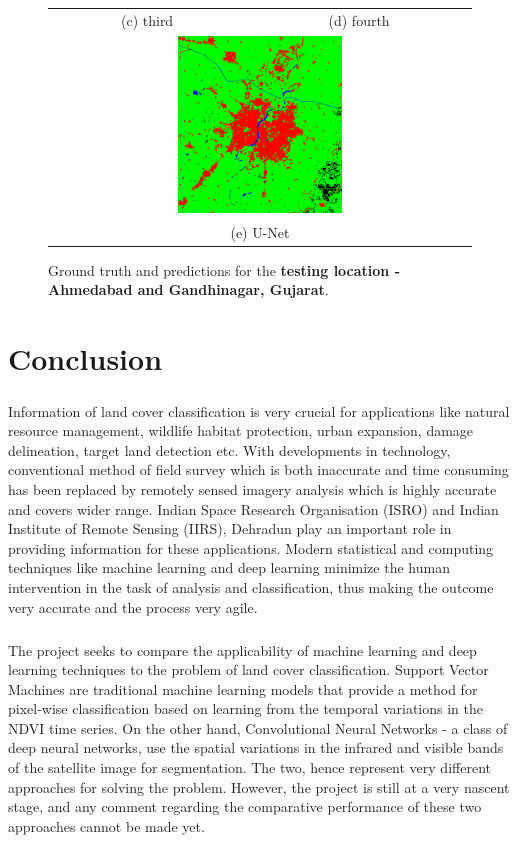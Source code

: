 \documentclass[12pt, a4paper]{report}
\begin{document}
\begin{figure}
\begin{center}
\begin{tabular}{cc}
(c) third & (d) fourth \\[6pt]
\multicolumn{2}{c}{\includegraphics[width=0.4\textwidth]{test_cnn} }\\
\multicolumn{2}{c}{(e) U-Net}
\end{tabular}
\caption{Ground truth and predictions for the \textbf{testing location - Ahmedabad and Gandhinagar, Gujarat}.}
\end{center}
\end{figure}

\chapter{Conclusion}

\paragraph{}
Information of land cover classification is very crucial for applications like natural resource management, wildlife habitat protection, urban expansion, damage delineation, target land detection etc. With developments in technology, conventional method of field survey which is both inaccurate and time consuming has been replaced by remotely sensed imagery analysis which is highly accurate and covers wider range. Indian Space Research Organisation (ISRO) and Indian Institute of Remote Sensing (IIRS), Dehradun play an important role in providing information for these applications. Modern statistical and computing techniques like machine learning and deep learning minimize the human intervention in the task of analysis and classification, thus making the outcome very accurate and the process very agile.
\paragraph{}
The project seeks to compare the applicability of machine learning and deep learning techniques to the problem of land cover classification. Support Vector Machines are traditional machine learning models that provide a method for pixel-wise classification based on learning from the temporal variations in the NDVI time series. On the other hand, Convolutional Neural Networks - a class of deep neural networks, use the spatial variations in the infrared and visible bands of the satellite image for segmentation. The two, hence represent very different approaches for solving the problem. However, the project is still at a very nascent stage, and any comment regarding the comparative performance of these two approaches cannot be made yet.
\end{document}
